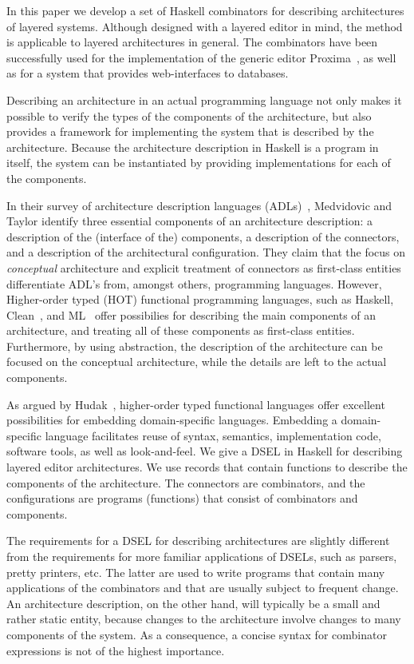 \documentclass[preprint,natbib]{sigplanconf}
\begin{document}
In this paper we develop a set of Haskell combinators for describing architectures of layered systems. Although designed with a layered editor in mind, the method is applicable to layered architectures in general. The combinators have been successfully used for the implementation of the generic editor Proxima~\cite{Schrage04Proxima}, as well as for a system that provides web-interfaces to databases. 

Describing an architecture in an actual programming language not only makes it possible to verify the types of the components of the architecture, but also provides a framework for implementing the system that is described by the architecture. Because the architecture description in Haskell is a program in itself, the system can be instantiated by providing implementations for each of the components.

In their survey of architecture description languages (ADLs)~\cite{medvidovic00ADLs}, Medvidovic and Taylor identify three essential components of an architecture description: a description of the (interface of the) components, a description of the connectors, and a description of the architectural configuration. They claim that the focus on {\em conceptual} architecture and explicit treatment of connectors as first-class entities differentiate ADL's from, amongst others, programming languages. However, Higher-order typed (HOT) functional programming languages, such as Haskell, Clean~\cite{plasmeijer01clean}, and ML~\cite{milner97ML} offer possibilies for describing the main components of an architecture, and treating all of these components as first-class entities. Furthermore, by using abstraction, the description of the architecture can be focused on the conceptual architecture, while the details are left to the actual components.

As argued by Hudak~\cite{hudak98DSLs}, higher-order typed functional languages offer excellent possibilities for embedding domain-specific languages. Embedding a domain-specific language facilitates reuse of syntax, semantics, implementation code, software tools, as well as look-and-feel. We give a DSEL in Haskell for describing layered editor architectures. We use records that contain functions to describe the components of the architecture. The connectors are combinators, and the configurations are programs (functions) that consist of combinators and components. 

\bc
The requirements for a DSEL for describing architectures are slightly different from the requirements for more familiar applications of DSELs, such as parsers, pretty printers, etc. The latter are used to write programs that contain many applications of the combinators and that are usually subject to frequent change. An architecture description, on the other hand, will typically be a small and rather static entity, because changes to the architecture involve changes to many components of the system.  As a consequence, a concise syntax for combinator expressions is not of the highest importance.
\ec
\end{document}
